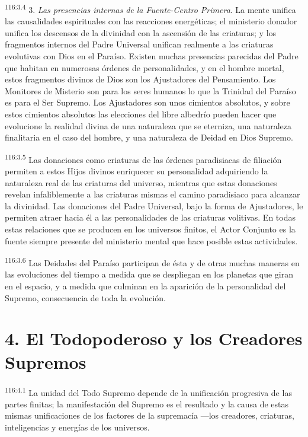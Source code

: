 \documentclass[twoside, 11pt]{book}
\begin{document}
\par
\textsuperscript{116:3.4} 3. \textit{Las presencias internas de la Fuente-Centro Primera}. La mente unifica las causalidades espirituales con las reacciones energéticas; el ministerio donador unifica los descensos de la divinidad con la ascensión de las criaturas; y los fragmentos internos del Padre Universal unifican realmente a las criaturas evolutivas con Dios en el Paraíso. Existen muchas presencias parecidas del Padre que habitan en numerosas órdenes de personalidades, y en el hombre mortal, estos fragmentos divinos de Dios son los Ajustadores del Pensamiento. Los Monitores de Misterio son para los seres humanos lo que la Trinidad del Paraíso es para el Ser Supremo. Los Ajustadores son unos cimientos absolutos, y sobre estos cimientos absolutos las elecciones del libre albedrío pueden hacer que evolucione la realidad divina de una naturaleza que se eterniza, una naturaleza finalitaria en el caso del hombre, y una naturaleza de Deidad en Dios Supremo.

\par
\textsuperscript{116:3.5} Las donaciones como criaturas de las órdenes paradisiacas de filiación permiten a estos Hijos divinos enriquecer su personalidad adquiriendo la naturaleza real de las criaturas del universo, mientras que estas donaciones revelan infaliblemente a las criaturas mismas el camino paradisiaco para alcanzar la divinidad. Las donaciones del Padre Universal, bajo la forma de Ajustadores, le permiten atraer hacia él a las personalidades de las criaturas volitivas. En todas estas relaciones que se producen en los universos finitos, el Actor Conjunto es la fuente siempre presente del ministerio mental que hace posible estas actividades.

\par
\textsuperscript{116:3.6} Las Deidades del Paraíso participan de ésta y de otras muchas maneras en las evoluciones del tiempo a medida que se despliegan en los planetas que giran en el espacio, y a medida que culminan en la aparición de la personalidad del Supremo, consecuencia de toda la evolución.

\section*{4. El Todopoderoso y los Creadores Supremos}
\par
\textsuperscript{116:4.1} La unidad del Todo Supremo depende de la unificación progresiva de las partes finitas; la manifestación del Supremo es el resultado y la causa de estas mismas unificaciones de los factores de la supremacía ---los creadores, criaturas, inteligencias y energías de los universos.
\end{document}
